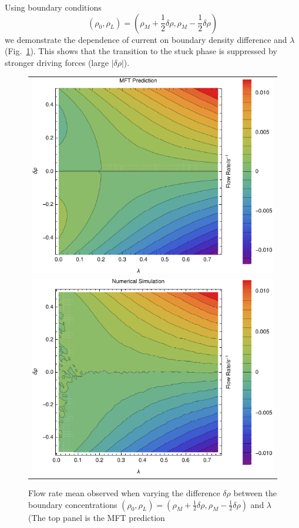 \documentclass[
reprint, amsmath,amssymb, aps,
 prx,
]{revtex4-1}
\begin{document}
Using boundary conditions
\begin{equation}
(\rho_0,\rho_L)=(\rho_M+\frac{1}{2}\delta\rho, \rho_M-\frac{1}{2}\delta\rho) 
\end{equation}
we demonstrate the
dependence of current on boundary density difference and $\lambda$ (Fig.~\ref{fig:constDens}).  This
shows that the transition to the stuck phase is suppressed by stronger
driving forces (large $|\delta\rho|$).
\begin{figure}[h!]
\vspace{0em}
\begin{center}
 \begin{tabular}{c}
    \includegraphics[width=0.7\linewidth]{newMftPred} \\
    \includegraphics[width=0.7\linewidth]{newFlow}
    \end{tabular}
\end{center}
    \vspace{0em}
\caption{\label{fig:constDens} Flow rate mean observed when varying the difference $\delta\rho$ between the boundary concentrations
$(\rho_0, \rho_L) = (\rho_M + \frac{1}{2} \delta\rho, \rho_M - \frac{1}{2} \delta\rho)$ and $\lambda$ (The top panel is the MFT prediction
}
\end{figure}
\end{document}
